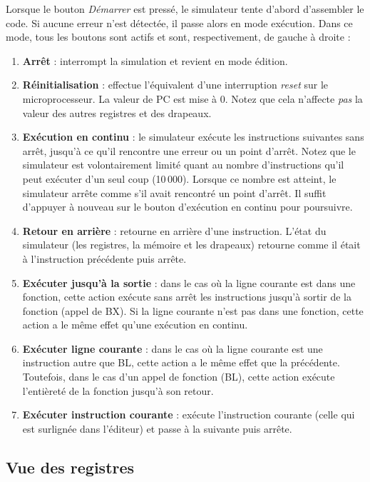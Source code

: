 \documentclass{tufte-handout}
\begin{document}
Lorsque le bouton \textit{Démarrer} est pressé, le simulateur tente d'abord d'assembler le code. Si aucune erreur n'est détectée, il passe alors en mode exécution. Dans ce mode, tous les boutons sont actifs et sont, respectivement, de gauche à droite :
\begin{enumerate}
	\item \textbf{Arrêt} : interrompt la simulation et revient en mode édition.
	\item \textbf{Réinitialisation} : effectue l'équivalent d'une interruption \emph{reset} sur le microprocesseur. La valeur de PC est mise à $0$. Notez que cela n'affecte \emph{pas} la valeur des autres registres et des drapeaux.
	\item \textbf{Exécution en continu} : le simulateur exécute les instructions suivantes sans arrêt, jusqu'à ce qu'il rencontre une erreur ou un point d'arrêt. Notez que le simulateur est volontairement limité quant au nombre d'instructions qu'il peut exécuter d'un seul coup (10\,000). Lorsque ce nombre est atteint, le simulateur arrête comme s'il avait rencontré un point d'arrêt. Il suffit d'appuyer à nouveau sur le bouton d'exécution en continu pour poursuivre.
    \item \textbf{Retour en arrière} : retourne en arrière d'une instruction. L'état du simulateur (les registres, la mémoire et les drapeaux) retourne comme il était à l'instruction précédente puis arrête.
	\item \textbf{Exécuter jusqu'à la sortie} : dans le cas où la ligne courante est dans une fonction, cette action exécute sans arrêt les instructions jusqu'à sortir de la fonction (appel de BX). Si la ligne courante n'est pas dans une fonction, cette action a le même effet qu'une exécution en continu.
	\item \textbf{Exécuter ligne courante} : dans le cas où la ligne courante est une instruction autre que BL, cette action a le même effet que la précédente. Toutefois, dans le cas d'un appel de fonction (BL), cette action exécute l'entièreté de la fonction jusqu'à son retour.
	\item \textbf{Exécuter instruction courante} : exécute l'instruction courante (celle qui est surlignée dans l'éditeur) et passe à la suivante puis arrête.
\end{enumerate}

\clearpage

\subsection{Vue des registres}
\end{document}
